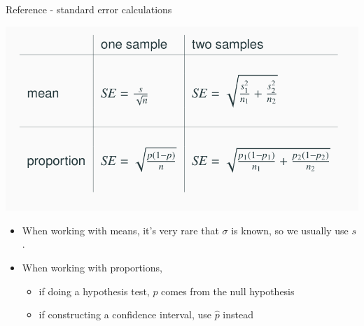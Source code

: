 \documentclass[
  ignorenonframetext,
]{beamer}
\providecommand{\tightlist}{%
  \setlength{\itemsep}{0pt}\setlength{\parskip}{0pt}}
\begin{document}
\begin{frame}{Reference - standard error calculations}
\protect\hypertarget{reference---standard-error-calculations-1}{}

\includegraphics[width=650px]{ref_table}

\begin{itemize}
\tightlist
\item
  When working with means, it's very rare that \(\sigma\) is known, so
  we usually use \(s\).
\item
  When working with proportions,

  \begin{itemize}
  \tightlist
  \item
    if doing a hypothesis test, \(p\) comes from the null hypothesis
  \item
    if constructing a confidence interval, use \(\hat{p}\) instead
  \end{itemize}
\end{itemize}

\end{frame}
\end{document}
